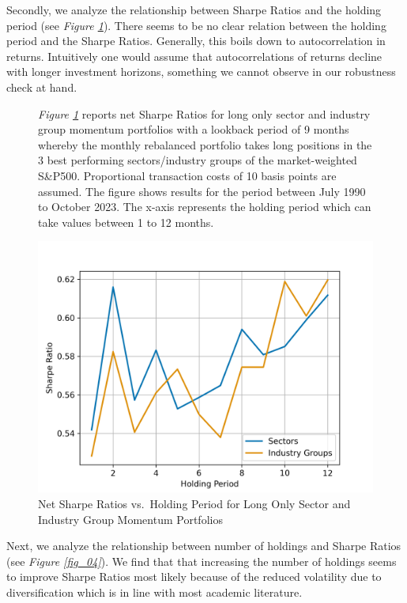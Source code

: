 \documentclass[a4paper,12pt,twoside]{article}
\begin{document}
\newpage
Secondly, we analyze the relationship between Sharpe Ratios and the holding period (see \textit{Figure \ref{fig_05}}). There seems to be no clear relation between the holding period and the Sharpe Ratios. Generally, this boils down to autocorrelation in returns. Intuitively one would assume that autocorrelations of returns decline with longer investment horizons, something we cannot observe in our robustness check at hand.

\begin{figure}[H]
       \captionsetup{justification=centering}
   \caption{Net Sharpe Ratios vs.~Holding Period for Long Only Sector and Industry Group Momentum Portfolios}
    \label{fig_05}
        \textit{Figure \ref{fig_05}} reports net Sharpe Ratios for long only sector and industry group momentum portfolios with a lookback period of 9 months whereby the monthly rebalanced portfolio takes long positions in the 3 best performing sectors/industry groups of the market-weighted S\&P500. Proportional transaction costs of 10 basis points are assumed. The figure shows results for the period between July 1990 to October 2023. The x-axis represents the holding period which can take values between 1 to 12 months.
    \centerline{\includegraphics[width=1\textwidth]{Plots/robustness_check_holdingperiod.png}}
\end{figure}

\newpage
Next, we analyze the relationship between number of holdings and Sharpe Ratios (see \textit{Figure \ref{fig_04}}). We find that that increasing the number of holdings seems to improve Sharpe Ratios most likely because of the reduced volatility due to diversification which is in line with most academic literature.\\
\end{document}
